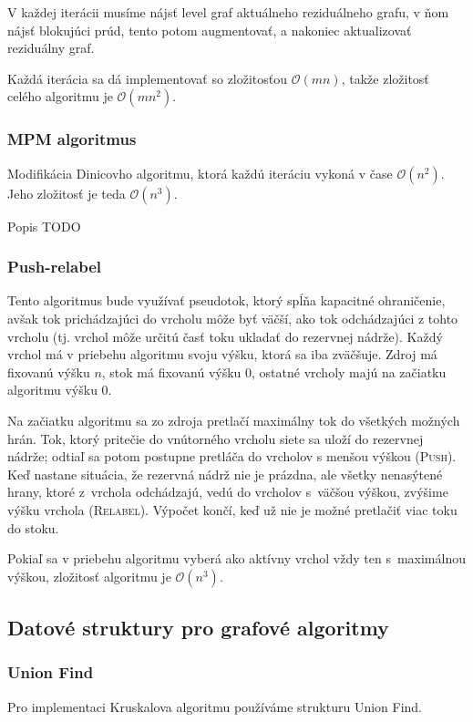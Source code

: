 V každej iterácii musíme nájsť level graf aktuálneho reziduálneho grafu,
v ňom nájsť blokujúci prúd, tento potom augmentovať, a nakoniec 
aktualizovať reziduálny graf.

Každá iterácia sa dá implementovať so zložitosťou $\mathcal{O}(mn)$, takže
zložitosť celého algoritmu je $\mathcal{O}(mn^2)$.

\subsubsection*{MPM algoritmus}
Modifikácia Dinicovho algoritmu, ktorá každú iteráciu vykoná v čase $\mathcal{O}(n^2)$.
Jeho zložitosť je teda $\mathcal{O}(n^3)$.

Popis TODO

\subsubsection*{Push-relabel}
Tento algoritmus bude využívať pseudotok, ktorý spĺňa kapacitné
ohraničenie, avšak tok prichádzajúci do vrcholu môže byť väčší, 
ako tok odchádzajúci z tohto vrcholu (tj. vrchol môže určitú časť
toku ukladať do rezervnej nádrže). Každý vrchol má v priebehu 
algoritmu svoju výšku, ktorá sa iba zväčšuje. Zdroj má fixovanú
výšku $n$, stok má fixovanú výšku $0$, ostatné vrcholy majú na začiatku
algoritmu výšku $0$.

Na začiatku algoritmu sa zo zdroja pretlačí maximálny tok
do všetkých možných hrán. Tok, ktorý pritečie do vnútorného vrcholu
siete sa uloží do rezervnej nádrže; odtiaľ sa potom postupne pretláča
do vrcholov s menšou výškou (\textsc{Push}). Keď nastane situácia, že 
rezervná nádrž nie je prázdna, ale všetky nenasýtené hrany, ktoré z~vrchola
odchádzajú, vedú do vrcholov s~väčšou výškou, zvýšime výšku vrchola
(\textsc{Relabel}). Výpočet končí, keď už nie je možné pretlačiť viac
toku do stoku.

Pokiaľ sa v priebehu algoritmu vyberá ako aktívny vrchol vždy ten
s~maximálnou výškou, zložitosť algoritmu je $\mathcal{O}(n^3)$.

\subsection{Datové struktury pro grafové algoritmy}
\label{subsec:data_structures}

\subsubsection*{Union Find}
Pro implementaci Kruskalova
algoritmu používáme strukturu Union Find.

